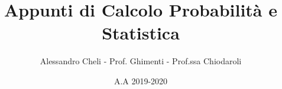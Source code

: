 \documentclass[a4paper,12pt]{book}
\theoremstyle{plain}%
\theoremstyle{definition}
\theoremstyle{remark}
\begin{document}
\author{Alessandro Cheli - Prof. Ghimenti - Prof.ssa Chiodaroli}
\title{Appunti di Calcolo Probabilità e Statistica}
\date{A.A 2019-2020}

\frontmatter
\maketitle
\tableofcontents

\mainmatter




\backmatter
\end{document}
